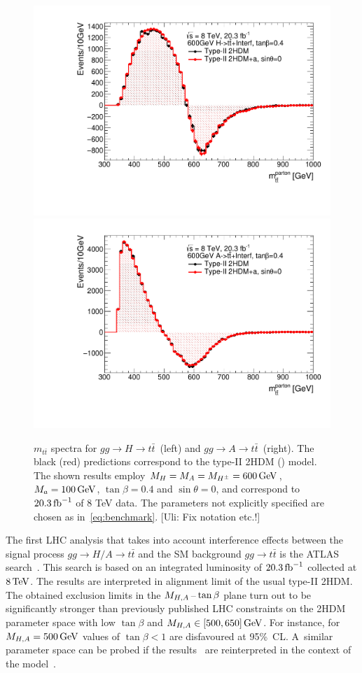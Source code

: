 \begin{figure}
\centering
\includegraphics[width=.475\textwidth]{texinputs/04_grid/figures/ttres/ttres_2HDMvs2HDMa_H.pdf} \quad 
\includegraphics[width=.475\textwidth]{texinputs/04_grid/figures/ttres/ttres_2HDMvs2HDMa_A.pdf}
\vspace{4mm}
\caption{$m_{t \bar t}$ spectra for $gg \to H \to t \bar t$~(left) and  $gg \to A \to t \bar t$~(right). The black (red) predictions correspond to the type-II 2HDM (\hdma) model.  The shown results employ $M_{H}=M_{A}=M_{H^{\pm}} = 600 \, {\rm GeV}$,  $M_{a}=100 \, {\rm GeV}$, $\tan \beta =0.4$ and $\sin \theta = 0$, and correspond to $20.3 \, {\rm fb}^{-1}$ of 8 TeV data.  The parameters not explicitly specified are chosen as in~\eqref{eq:benchmark}. {\color{red} [Uli: Fix notation etc.!]}}
\label{fig:ttres_2HDMvs2HDMa}
\end{figure}

The first LHC analysis that takes into account interference effects between the signal process $gg \to H/A \to t \bar t$ and the SM background $gg \to t \bar t$ is the ATLAS search~\cite{Aaboud:2017hnm}. This search  is based on an integrated luminosity of $20.3 \, {\rm fb}^{-1}$ collected at $8 \, {\rm TeV}$. The results are interpreted in alignment limit of the usual type-II 2HDM. The obtained  exclusion limits in the $M_{H,A}\hspace{0.5mm}$--$\hspace{0.5mm} \tan \beta$ plane turn out to be significantly stronger than previously published LHC constraints on the 2HDM parameter space with low $\tan \beta$ and $M_{H,A} \in [500, 650] \, {\rm GeV}$. For instance,  for $M_{H,A} = 500 \, {\rm GeV}$ values of $\tan \beta < 1$ are disfavoured at 95\%~CL. A~similar parameter space  can be probed if the results~\cite{Aaboud:2017hnm} are reinterpreted in the context of the \hdma model~\cite{Bauer:2017ota}. 

